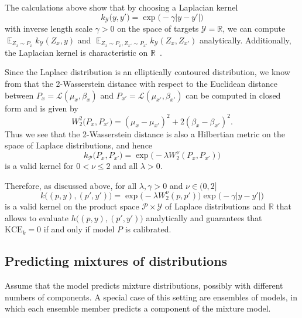 \documentclass{article}
\DeclareMathOperator{\Exp}{\mathbb{E}}
\begin{document}
The calculations above show that by choosing a Laplacian
kernel
\begin{equation*}
    k_{\mathcal{Y}}\big(y, y'\big) = \exp{\big(-\gamma |y-y'|\big)}
\end{equation*}
with inverse length scale $\gamma > 0$ on the space of targets
$\mathcal{Y} = \mathbb{R}$, we can compute
$\Exp_{Z_x \sim P_x} k_{\mathcal{Y}}(Z_x, y)$ and
$\Exp_{Z_x \sim P_x, Z_{x'} \sim P_{x'}} k_{\mathcal{Y}}(Z_x, Z_{x'})$
analytically. Additionally, the Laplacian kernel is characteristic
on $\mathbb{R}$~\citep{Fukumizu2008}.

Since the Laplace distribution is an elliptically contoured
distribution, we know from \citet[Corollary~2]{Gelbrich1990} that
the 2-Wasserstein distance with respect to the Euclidean distance between
$P_x = \mathcal{L}(\mu_x, \beta_x)$ and
$P_{x'} = \mathcal{L}(\mu_{x'}, \beta_{x'})$ can be
computed in closed form and is given by
\begin{equation*}
    W^2_2\big(P_x, P_{x'}\big) = {(\mu_x - \mu_{x'})}^2 + 2{(\beta_x - \beta_{x'})}^2.
\end{equation*}
Thus we see that the 2-Wasserstein distance is also a Hilbertian metric
on the space of Laplace distributions, and hence
\begin{equation*}
    k_{\mathcal{P}}\big(P_x, P_{x'}\big) = \exp{\big(- \lambda W_2^\nu(P_x, P_{x'})\big)}
\end{equation*}
is a valid kernel for $0 < \nu \leq 2$ and all $\lambda > 0$.

Therefore, as discussed above, for all $\lambda, \gamma > 0$ and $\nu \in (0, 2]$
\begin{equation*}
    k\big((p, y), (p', y')\big) = \exp{\big(-\lambda W^\nu_2(p, p')\big)} \exp{\big(-\gamma |y-y'|\big)}
\end{equation*}
is a valid kernel on the product space $\mathcal{P} \times \mathcal{Y}$
of Laplace distributions and $\mathbb{R}$ that allows to evaluate
$h\big((p, y), (p', y')\big)$ analytically and guarantees that $\mathrm{KCE}_k = 0$
if and only if model $P$ is calibrated.

\subsection{Predicting mixtures of distributions}
\label{app:mixture}

Assume that the model predicts mixture distributions, possibly with different
numbers of components. A special case of this setting are ensembles of models,
in which each ensemble member predicts a component of the mixture model.
\end{document}
